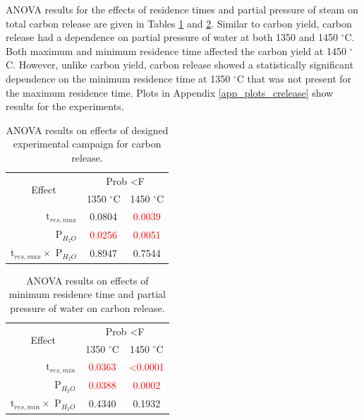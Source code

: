 \documentclass[11pt,twocolumn]{article}
\begin{document}
ANOVA results for the effects of residence times and partial pressure of steam on total carbon release are given in Tables \ref{anova_release} and \ref{anova_release_tmin}.  Similar to carbon yield, carbon release had a dependence on partial pressure of water at both 1350 and 1450 $^\circ$C.  Both maximum and minimum residence time affected the carbon yield at 1450 $^\circ$C.  However, unlike carbon yield, carbon release showed a statistically significant dependence on the minimum residence time at 1350 $^\circ$C that was not present for the maximum residence time.  Plots in Appendix \ref{app_plots_crelease} show results for the experiments.

\begin{table}
	\centering
	\caption{ANOVA results on effects of designed experimental campaign for carbon release.}
	\begin{tabular}{r c c}
		\toprule
		\multicolumn{1}{c}{\multirow{2}{*}{Effect}}		& 	\multicolumn{2}{c}{Prob \textless F	}	\\
		{}								&	1350 $^\circ$C					&	1450 $^\circ$C			\\
		\midrule
		t$_{res,max}$						&	0.0804						&	\textcolor{red}{0.0039}	\\
		P$_{H_2O}$						&	\textcolor{red}{0.0256}			&	\textcolor{red}{0.0051}	\\
		t$_{res,max}\times$ P$_{H_2O}$		&	0.8947						&	0.7544				\\
		\bottomrule
	\end{tabular}
	\label{anova_release}
\end{table}

\begin{table}
	\centering
	\caption{ANOVA results on effects of minimum residence time and partial pressure of water on carbon release.}
	\begin{tabular}{r c c}
		\toprule
		\multicolumn{1}{c}{\multirow{2}{*}{Effect}}		& 	\multicolumn{2}{c}{Prob \textless F	}	\\
		{}								&	1350 $^\circ$C					&	1450 $^\circ$C			\\
		\midrule
		t$_{res,min}$						&	\textcolor{red}{0.0363}			&	\textcolor{red}{\textless 0.0001}	\\
		P$_{H_2O}$						&	\textcolor{red}{0.0388}			&	\textcolor{red}{0.0002}	\\
		t$_{res,min}\times$ P$_{H_2O}$		&	0.4340						&	0.1932				\\
		\bottomrule
	\end{tabular}
	\label{anova_release_tmin}
\end{table}
\end{document}
